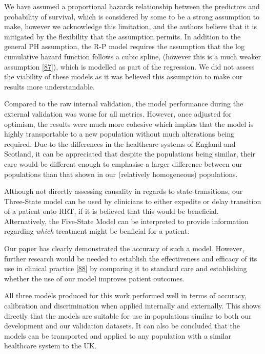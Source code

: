 \documentclass[12pt,PhD,twoside,openright]{muthesis}
\begin{document}
We have assumed a proportional hazards relationship between the predictors and probability of survival, which is considered by some to be a strong assumption to make, however we acknowledge this limitation, and the authors believe that it is mitigated by the flexibility that the assumption permits. In addition to the general PH assumption, the R-P model requires the assumption that the log cumulative hazard function follows a cubic spline, (however this is a much weaker assumption {[}\protect\hyperlink{ref-royston_flexible_2002}{87}{]}), which is modelled as part of the regression. We did not assess the viability of these models as it was believed this assumption to make our results more understandable.

Compared to the raw internal validation, the model performance during the external validation was worse for all metrics. However, once adjusted for optimism, the results were much more cohesive which implies that the model is highly transportable to a new population without much alterations being required. Due to the differences in the healthcare systems of England and Scotland, it can be appreciated that despite the populations being similar, their care would be different enough to emphasise a larger difference between our populations than that shown in our (relatively homogeneous) populations.

Although not directly assessing causality in regards to state-transitions, our Three-State model can be used by clinicians to either expedite or delay transition of a patient onto RRT, if it is believed that this would be beneficial. Alternatively, the Five-State Model can be interpreted to provide information regarding \emph{which} treatment might be benficial for a patient.

Our paper has clearly demonstrated the accuracy of such a model. However, further research would be needed to establish the effectiveness and efficacy of its use in clinical practice {[}\protect\hyperlink{ref-moons_prognosis_2009-1}{88}{]} by comparing it to standard care and establishing whether the use of our model improves patient outcomes.

All three models produced for this work performed well in terms of accuracy, calibration and discrimination when applied internally and externally. This shows directly that the models are suitable for use in populations similar to both our development and our validation datasets. It can also be concluded that the models can be transported and applied to any population with a similar healthcare system to the UK.
\end{document}
